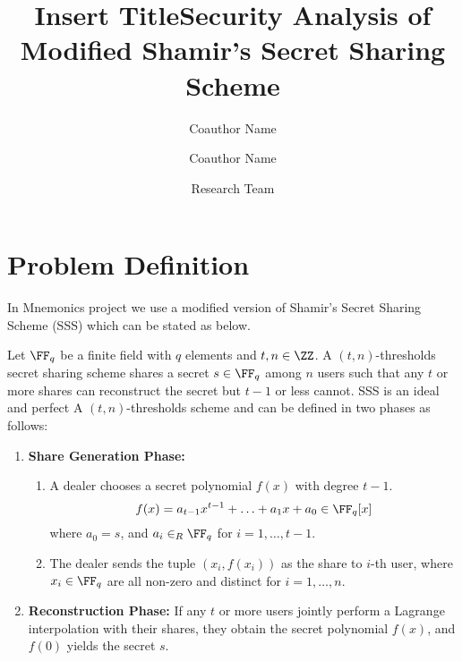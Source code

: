 \documentclass[envcountsame,runningheads,notitlepage]{llncs}
\title{Insert Title}
\date{}
\author{
	Coauthor Name\inst{1} \and
	Coauthor Name\inst{2}
}%
\institute{Coauthor University\\
	\href{mailto:mail@mail.com}{mail@mail.com} \and
	Coauthor University\\
	\href{mailto:mail@mail.com}{mail@mail.com}
}  %
\author{}
\institute{}
\begin{document}
	\title{Security Analysis of Modified Shamir's Secret Sharing Scheme}
	
	\author{Research Team}
	\maketitle
	
	\section{Problem Definition}
	In Mnemonics project we use a modified version of Shamir's Secret Sharing Scheme (SSS) \cite{Shamir79} which can be stated as below. 
	
	\begin{definition}\label{def:shamir}
		Let $\FF_q$ be a finite field with $q$ elements and $t,n \in \ZZ$. A $(t, n)$-thresholds secret sharing scheme shares a secret $s \in \FF_q$ among $n$ users such that any $t$ or more shares can reconstruct the secret but $t-1$ or less cannot. SSS is an ideal and perfect A $(t, n)$-thresholds scheme and can be defined in two phases as follows:
		
		\begin{enumerate}
			\item \textbf{Share Generation Phase:} 
			\begin{enumerate}
				\item A dealer chooses a secret polynomial $f (x)$ with degree $t - 1$.
				\begin{equation*}
				f (x) = a_{t-1}x^{t-1} + \ldots + a_1x + a_0 \in \FF_q [x]
				\end{equation*}
				where $a_0 = s$, and $a_i \in_{R} \FF_q$ for $i = 1, \ldots, t-1$. 
				\item The dealer sends the tuple $(x_{i}, f (x_{i}))$ as the share to $i$-th user, where $x_{i} \in \FF_q$ are all non-zero and distinct for $i = 1, \ldots, n$. 
			\end{enumerate}
			
			\item \textbf{Reconstruction Phase:} 
			If any $t$ or more users jointly perform a Lagrange interpolation with their shares, they obtain the secret polynomial $f (x)$, and $f(0)$ yields the secret $s$.
		\end{enumerate}
	\end{definition}
	
\end{document}
